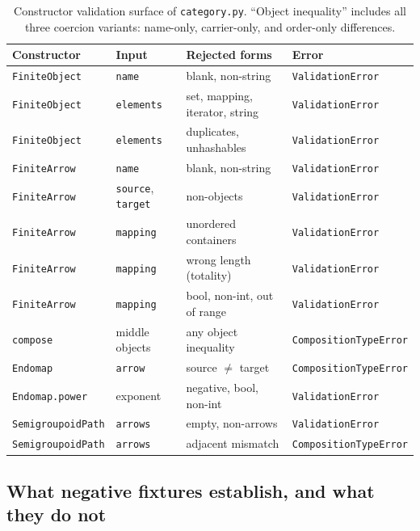 \begin{table}[htbp]
\centering
\small
\begin{tabular}{@{}llll@{}}
\toprule
Constructor & Input & Rejected forms & Error \\
\midrule
\texttt{FiniteObject} & \texttt{name} & blank, non-string & \texttt{ValidationError} \\
\texttt{FiniteObject} & \texttt{elements} & set, mapping, iterator, string & \texttt{ValidationError} \\
\texttt{FiniteObject} & \texttt{elements} & duplicates, unhashables & \texttt{ValidationError} \\
\texttt{FiniteArrow} & \texttt{name} & blank, non-string & \texttt{ValidationError} \\
\texttt{FiniteArrow} & \texttt{source}, \texttt{target} & non-objects & \texttt{ValidationError} \\
\texttt{FiniteArrow} & \texttt{mapping} & unordered containers & \texttt{ValidationError} \\
\texttt{FiniteArrow} & \texttt{mapping} & wrong length (totality) & \texttt{ValidationError} \\
\texttt{FiniteArrow} & \texttt{mapping} & bool, non-int, out of range & \texttt{ValidationError} \\
\texttt{compose} & middle objects & any object inequality & \texttt{CompositionTypeError} \\
\texttt{Endomap} & \texttt{arrow} & source $\neq$ target & \texttt{CompositionTypeError} \\
\texttt{Endomap.power} & exponent & negative, bool, non-int & \texttt{ValidationError} \\
\texttt{SemigroupoidPath} & \texttt{arrows} & empty, non-arrows & \texttt{ValidationError} \\
\texttt{SemigroupoidPath} & \texttt{arrows} & adjacent mismatch & \texttt{CompositionTypeError} \\
\bottomrule
\end{tabular}
\caption{Constructor validation surface of \texttt{category.py}.
``Object inequality'' includes all three coercion variants: name-only,
carrier-only, and order-only differences.}
\label{ch03:tab:validation}
\end{table}

\subsection{What negative fixtures establish, and what they do not}

